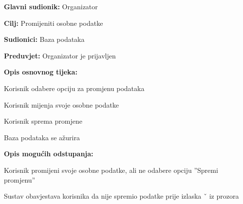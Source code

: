 					\noindent {}
					\begin{packed_item}

						\item \textbf{Glavni sudionik: } Organizator
						\item  \textbf{Cilj:} Promijeniti osobne podatke
						\item  \textbf{Sudionici:} Baza podataka
						\item  \textbf{Preduvjet:} Organizator je prijavljen
						\item  \textbf{Opis osnovnog tijeka:}

						\item[] \begin{packed_enum}

							\item Korisnik odabere opciju za promjenu podataka
							\item Korisnik mijenja svoje osobne podatke
							\item Korisnik sprema promjene
							\item Baza podataka se ažurira
						\end{packed_enum}

						\item  \textbf{Opis mogućih odstupanja:}

						\item[] \begin{packed_item}

							\item[2.a] Korisnik promijeni svoje osobne podatke, ali ne odabere opciju ”Spremi
							promjenu”
							\item[] \begin{packed_enum}

								\item Sustav obavjestava korisnika da nije spremio podatke prije izlaska ˇ
								iz prozora

							\end{packed_enum}

						\end{packed_item}

					\end{packed_item}

